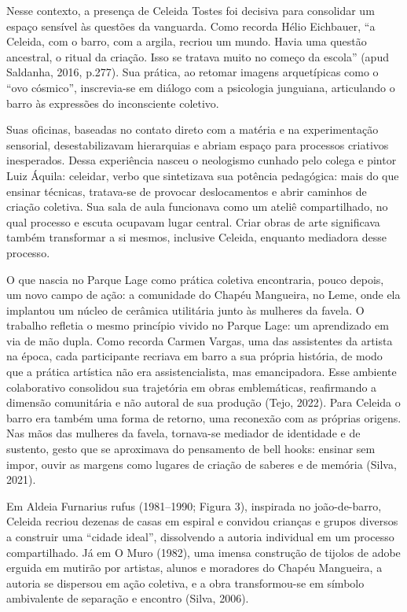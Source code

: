 Nesse contexto, a presença de Celeida Tostes foi decisiva para consolidar um espaço sensível às questões da vanguarda. Como recorda Hélio Eichbauer, “a Celeida, com o barro, com a argila, recriou um mundo. Havia uma questão ancestral, o ritual da criação. Isso se tratava muito no começo da escola” (apud Saldanha, 2016, p.277). Sua prática, ao retomar imagens arquetípicas como o “ovo cósmico”, inscrevia-se em diálogo com a psicologia junguiana, articulando o barro às expressões do inconsciente coletivo.

Suas oficinas, baseadas no contato direto com a matéria e na experimentação sensorial, desestabilizavam hierarquias e abriam espaço para processos criativos inesperados. Dessa experiência nasceu o neologismo cunhado pelo colega e pintor Luiz Áquila: celeidar, verbo que sintetizava sua potência pedagógica: mais do que ensinar técnicas, tratava-se de provocar deslocamentos e abrir caminhos de criação coletiva. Sua sala de aula funcionava como um ateliê compartilhado, no qual processo e escuta ocupavam lugar central. Criar obras de arte significava também transformar a si mesmos, inclusive Celeida, enquanto mediadora desse processo. 

O que nascia no Parque Lage como prática coletiva encontraria, pouco depois, um novo campo de ação: a comunidade do Chapéu Mangueira, no Leme, onde ela implantou um núcleo de cerâmica utilitária junto às mulheres da favela. O trabalho refletia o mesmo princípio vivido no Parque Lage: um aprendizado em via de mão dupla. Como recorda Carmen Vargas, uma das assistentes da artista na época, cada participante recriava em barro a sua própria história, de modo que a prática artística não era assistencialista, mas emancipadora. Esse ambiente colaborativo consolidou sua trajetória em obras emblemáticas, reafirmando a dimensão comunitária e não autoral de sua produção (Tejo, 2022). Para Celeida o barro era também uma forma de retorno, uma reconexão com as próprias origens. Nas mãos das mulheres da favela, tornava-se mediador de identidade e de sustento, gesto que se aproximava do pensamento de bell hooks: ensinar sem impor, ouvir as margens como lugares de criação de saberes e de memória (Silva, 2021).

Em Aldeia Furnarius rufus (1981–1990; Figura 3), inspirada no joão-de-barro, Celeida recriou dezenas de casas em espiral e convidou crianças e grupos diversos a construir uma “cidade ideal”, dissolvendo a autoria individual em um processo compartilhado. Já em O Muro (1982), uma imensa construção de tijolos de adobe erguida em mutirão por artistas, alunos e moradores do Chapéu Mangueira, a autoria se dispersou em ação coletiva, e a obra transformou-se em símbolo ambivalente de separação e encontro (Silva, 2006).

